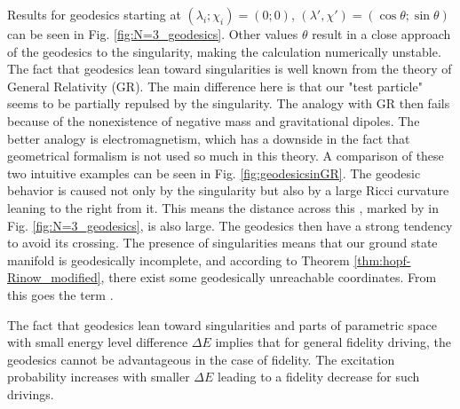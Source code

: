 Results for geodesics starting at $(\lambda_i;\chi_i)=(0;0)$, $
(\lambda',\chi')=(\cos\theta;\sin\theta)$ can be seen in Fig. \ref{fig:N=3_geodesics}. Other values $\theta$ result in a close approach of the geodesics to the singularity, making the calculation numerically unstable. The fact that geodesics lean toward singularities is well known from the theory of General Relativity (GR). The main difference here is that our "test particle" seems to be partially repulsed by the singularity. The analogy with GR then fails because of the nonexistence of negative mass and gravitational dipoles. The better analogy is electromagnetism, which has a downside in the fact that geometrical formalism is not used so much in this theory. A comparison of these two intuitive examples can be seen in Fig. \ref{fig:geodesicsinGR}. The geodesic behavior is caused not only by the singularity but also by a large Ricci curvature leaning to the right from it. This means the distance across this \emph{}, marked by  in Fig. \ref{fig:N=3_geodesics}, is also large. The geodesics then have a strong tendency to avoid its crossing. The presence of singularities means that our ground state manifold is geodesically incomplete, and according to Theorem \ref{thm:hopf-Rinow_modified}, there exist some geodesically unreachable coordinates. From this goes the term \emph{}.

The fact that geodesics lean toward singularities and parts of parametric space with small energy level difference $\Delta E$ implies that for general fidelity driving, the geodesics cannot be advantageous in the case of fidelity. The excitation probability increases with smaller $\Delta E$ leading to a fidelity decrease for such drivings.



